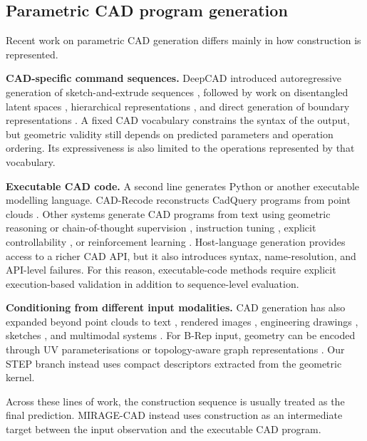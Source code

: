 \documentclass[preprint,12pt]{elsarticle}
\begin{document}
\subsection{Parametric CAD program generation}

Recent work on parametric CAD generation differs mainly in how construction is
represented.

\textbf{CAD-specific command sequences.}
DeepCAD introduced autoregressive generation of sketch-and-extrude sequences
\cite{wu2021deepcad}, followed by work on disentangled latent spaces
\cite{xu2022skexgen}, hierarchical representations
\cite{xu2023hierarchicalcad}, and direct generation of boundary
representations
\cite{jayaraman2023solidgen,xu2024brepgen,lee2025brepdiff}.
A fixed CAD vocabulary constrains the syntax of the output, but geometric
validity still depends on predicted parameters and operation ordering. Its
expressiveness is also limited to the operations represented by that
vocabulary.

\textbf{Executable CAD code.}
A second line generates Python or another executable modelling language.
CAD-Recode reconstructs CadQuery programs from point clouds
\cite{rukhovich2025cadrecode}. Other systems generate CAD programs from text
using geometric reasoning or chain-of-thought supervision
\cite{guan2025cadcoder}, instruction tuning
\cite{govindarajan2025cadmium,li2025cadllama}, explicit controllability
\cite{zhang2025flexcad,zhang2025geocad}, or reinforcement learning
\cite{yin2026rlcad}. Host-language generation provides access to a richer CAD
API, but it also introduces syntax, name-resolution, and API-level failures.
For this reason, executable-code methods require explicit execution-based
validation in addition to sequence-level evaluation.

\textbf{Conditioning from different input modalities.}
CAD generation has also expanded beyond point clouds to text
\cite{khan2024text2cad}, rendered images
\cite{you2025img2cad,alam2025gencad}, engineering drawings
\cite{wang2025cad2program,tang2025chatcad}, sketches
\cite{wu2024cadvlm}, and multimodal systems
\cite{kolodiazhnyi2025cadrille,zhou2025multimodalcadsurvey}.
For B-Rep input, geometry can be encoded through UV parameterisations
\cite{jayaraman2021uvnet} or topology-aware graph representations
\cite{lambourne2021brepnet,colligan2022hierarchicalcadnet}.
Our STEP branch instead uses compact descriptors extracted from the geometric
kernel.

Across these lines of work, the construction sequence is usually treated as
the final prediction. MIRAGE-CAD instead uses construction as an intermediate
target between the input observation and the executable CAD program.
\end{document}
